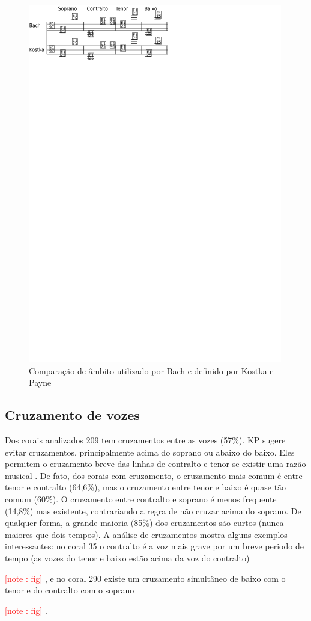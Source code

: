 \documentclass{article}
\newcounter{notecounter}
\newcommand{\note}[1]{
  \addtocounter{notecounter}{1}
  \textcolor{red}{[note \arabic{notecounter}: #1]}
}
\begin{document}
\begin{figure}
  \centering
  \includegraphics[scale=2.5]{ambitos}
  \caption{Comparação de âmbito utilizado por Bach e definido por Kostka e Payne}
  \label{fig:ambito-kostka}
\end{figure}

\subsection{Cruzamento de vozes}
\label{sec:cruzamento-de-vozes}

Dos corais analizados 209 tem cruzamentos entre as vozes (57\%). KP
sugere evitar cruzamentos, principalmente acima do soprano ou abaixo
do baixo. Eles permitem o cruzamento breve das linhas de contralto e
tenor se existir uma razão musical \cite[p. 79]{kostka.ea00:tonal}. De
fato, dos corais com cruzamento, o cruzamento mais comum é entre tenor
e contralto (64,6\%), mas o cruzamento entre tenor e baixo é quase tão
comum (60\%). O cruzamento entre contralto e soprano é menos frequente
(14,8\%) mas existente, contrariando a regra de não cruzar acima do
soprano. De qualquer forma, a grande maioria (85\%) dos cruzamentos
são curtos (nunca maiores que dois tempos). A análise de cruzamentos
mostra alguns exemplos interessantes: no coral 35 o contralto é a voz
mais grave por um breve periodo de tempo (as vozes do tenor e baixo
estão acima da voz do contralto) \note{fig}, e no coral 290 existe um
cruzamento simultâneo de baixo com o tenor e do contralto com o
soprano \note{fig}.
\end{document}
